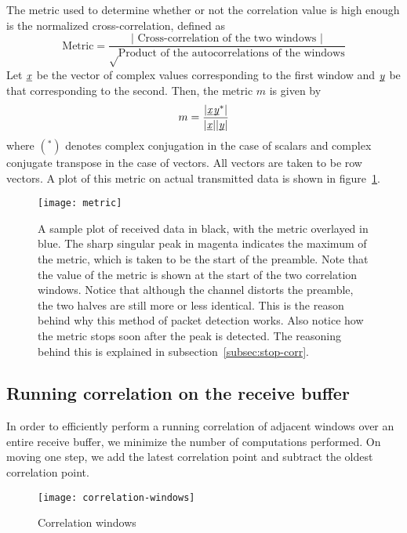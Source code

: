 The metric used to determine whether or not the correlation value is high
enough is the normalized cross-correlation, defined as
$$ \text{Metric} = \frac{|\text{ Cross-correlation of the two windows }|}
                        {\sqrt\text{Product of the autocorrelations of the
                                    windows}}
$$
Let $\underbar{\emph{x}}$ be the vector of complex values corresponding to the first window
and $\underbar{\emph{y}}$ be that corresponding to the second. Then, the metric $m$ is
given by
\begin{equation} \label{eqn:old-metric}
	m = \frac{|\corr{\ue{x}}{\ue{y}}|}{|\ue{x}||\ue{y}|}
\end{equation}
where $(^*)$ denotes complex conjugation in the case of scalars and complex
conjugate transpose in the case of vectors. All vectors are taken to be row
vectors. A plot of this metric on actual transmitted data is shown in
figure~\ref{fig:metric}.

\begin{figure}[h]
	\centering
	\texttt{[image: metric]}
	\caption{A sample plot of received data in black, with the metric overlayed
	         in blue. The sharp singular peak in magenta indicates the maximum
	         of the metric, which is taken to be the start of the preamble.
	         Note that the value of the metric is shown at the start of the two
	         correlation windows. Notice that although the channel distorts the
	         preamble, the two halves are still more or less identical. This is
	         the reason behind why this method of packet detection works. Also
	         notice how the metric stops soon after the peak is detected. The
	         reasoning behind this is explained in
	         subsection~\ref{subsec:stop-corr}.}
	\label{fig:metric}
\end{figure}

\subsection{Running correlation on the receive buffer}

In order to efficiently perform a running correlation of adjacent windows over
an entire receive buffer, we minimize the number of computations performed. On
moving one step, we add the latest correlation point and subtract the oldest
correlation point.

\begin{figure}[h]
	\centering
	\texttt{[image: correlation-windows]}
	\caption{Correlation windows}
	\label{fig:corr-win}
\end{figure}

